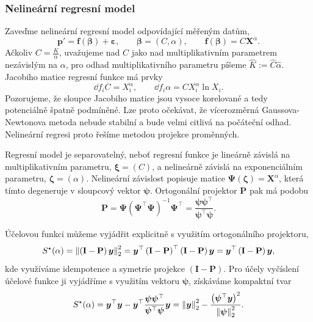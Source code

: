 \subsubsection{Nelineární regresní model}\label{sss:nelinearni_regresni_model}
Zaveďme nelineární regresní model odpovídající měřeným datům,
\begin{equation}
    \bm{p'}=\bm{f}(\bm{\beta}) +\bm{\varepsilon},\qquad\bm{\beta}=(C,\alpha),\qquad \bm{f}(\bm{\beta})= C\bm{X}^{\alpha}.
\end{equation}
Ačkoliv $C=\frac{K}{\alpha}$, uvažujeme nad $C$ jako nad multiplikativním parametrem nezávislým na $\alpha$, pro odhad multiplikativního parametru píšeme $\hat{K}:=\hat{C}\hat{\alpha}$. Jacobiho matice regresní funkce má prvky
\begin{equation}
    \dd{f_i}{C}=X_i^\alpha,\qquad \dd{f_i}{\alpha}=C X_i^\alpha\ln{X_i}.
\end{equation}
Pozorujeme, že sloupce Jacobiho matice jsou vysoce korelované a tedy potenciálně špatně podmíněné. Lze proto očekávat, že vícerozměrná Gaussova-Newtonova metoda nebude stabilní a bude velmi citlivá na počáteční odhad. Nelineární regresi proto řešíme metodou projekce proměnných.

Regresní model je separovatelný, neboť regresní funkce je lineárně závislá na multiplikativním parametru, $\bm{\xi}=(C)$, a nelineárně závislá na exponenciálním parametru, $\bm{\zeta}=(\alpha)$. Nelineární závislost popisuje matice $\mathbf{\Psi}(\bm{\zeta})=\bm{X}^\alpha$, která tímto degeneruje v sloupcový vektor $\bm{\psi}$. Ortogonální projektor $\mathbf{P}$ pak má podobu
\begin{equation}
    \mathbf{P}=\mathbf{\Psi}(\mathbf{\Psi}^\top\mathbf{\Psi})^{-1}\bm{\Psi}^\top=\frac{\bm{\psi} \bm{\psi}^\top}{\bm{\psi}^\top\bm{\psi}}.
\end{equation}

Účelovou funkci můžeme vyjádřit explicitně s využitím ortogonálního projektoru,
\begin{equation}
    S^\star(\alpha)=\left\lVert\left(\mathbf{I}-\mathbf{P}\right)\bm{y}\right\rVert_2^2=\bm{y}^\top\left(\mathbf{I}-\mathbf{P}\right)^\top\left(\mathbf{I}-\mathbf{P}\right)\bm{y}=\bm{y}^\top\left(\mathbf{I}-\mathbf{P}\right)\bm{y},
\end{equation}
kde využíváme idempotence a symetrie projekce $\left(\mathbf{I}-\mathbf{P}\right)$. Pro účely vyčíslení účelové funkce ji vyjádříme s využitím vektoru $\bm{\psi}$, získáváme kompaktní tvar
\begin{equation}
    S^\star(\alpha)=\bm{y}^\top\bm{y} -\bm{y}^\top \frac{\bm{\psi} \bm{\psi}^\top}{\bm{\psi}^\top\bm{\psi}}\bm{y}=\left\lVert\bm{y}\right\rVert_2^2-\frac{\left(\bm{\psi}^\top\bm{y}\right)^2}{\left\lVert\bm{\psi}\right\rVert_2^2}.
\end{equation}

